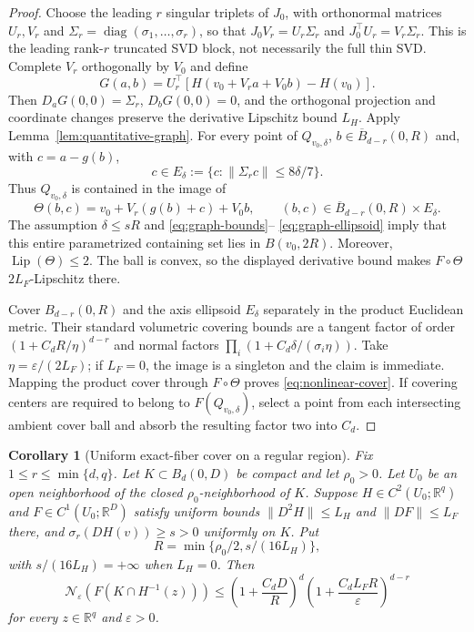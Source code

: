 \documentclass[11pt]{article}
\newtheorem{corollary}[theorem]{Corollary}
\theoremstyle{definition}
\newcommand{\R}{\mathbb R}
\newcommand{\cN}{\mathcal N}
\begin{document}
\begin{proof}
Choose the leading $r$ singular triplets of $J_0$, with orthonormal matrices
$U_r,V_r$ and $\Sigma_r=\operatorname{diag}(\sigma_1,\ldots,\sigma_r)$, so
that $J_0V_r=U_r\Sigma_r$ and $J_0^\top U_r=V_r\Sigma_r$.  This is the
leading rank-$r$ truncated SVD block, not necessarily the full thin SVD.
Complete $V_r$ orthogonally by $V_0$ and define
\[
 G(a,b)=U_r^\top
 [H(v_0+V_ra+V_0b)-H(v_0)].
\]
Then $D_aG(0,0)=\Sigma_r$, $D_bG(0,0)=0$, and the orthogonal projection and
coordinate changes preserve the derivative Lipschitz bound $L_H$.  Apply
Lemma~\ref{lem:quantitative-graph}.  For every point of $Q_{v_0,\delta}$,
$b\in\overline B_{d-r}(0,R)$ and, with $c=a-g(b)$,
\[
 c\in E_\delta
 :=\{c:\|\Sigma_rc\|\le8\delta/7\}.
\]
Thus $Q_{v_0,\delta}$ is contained in the image of
\[
 \Theta(b,c)=v_0+V_r(g(b)+c)+V_0b,
 \qquad (b,c)\in\overline B_{d-r}(0,R)\times E_\delta.
\]
The assumption $\delta\le sR$ and \eqref{eq:graph-bounds}--
\eqref{eq:graph-ellipsoid} imply that this entire parametrized containing set
lies in $B(v_0,2R)$.  Moreover, $\operatorname{Lip}(\Theta)\le2$.  The ball
is convex, so the displayed derivative bound makes
$F\circ\Theta$ $2L_F$-Lipschitz there.

Cover $B_{d-r}(0,R)$ and the axis ellipsoid $E_\delta$ separately in the
product Euclidean metric.  Their standard volumetric covering bounds are a
tangent factor of order $(1+C_dR/\eta)^{d-r}$ and normal factors
$\prod_i(1+C_d\delta/(\sigma_i\eta))$.  Take
$\eta=\varepsilon/(2L_F)$; if $L_F=0$, the image is a singleton and the
claim is immediate.  Mapping the product cover through $F\circ\Theta$ proves
\eqref{eq:nonlinear-cover}.  If covering centers are required to belong to
$F(Q_{v_0,\delta})$, select a point from each intersecting ambient cover ball
and absorb the resulting factor two into $C_d$.
\end{proof}

\begin{corollary}[Uniform exact-fiber cover on a regular region]
\label{cor:uniform-fiber}
Fix $1\le r\le\min\{d,q\}$.  Let $K\subset B_d(0,D)$ be compact and let
$\rho_0>0$.  Let $U_0$ be an open
neighborhood of the closed $\rho_0$-neighborhood of $K$.  Suppose
$H\in C^2(U_0;\R^q)$ and $F\in C^1(U_0;\R^D)$ satisfy uniform bounds
$\|D^2H\|\le L_H$ and $\|DF\|\le L_F$ there, and
$\sigma_r(DH(v))\ge s>0$ uniformly on $K$.  Put
\[
 R=\min\{\rho_0/2,s/(16L_H)\},
\]
with $s/(16L_H)=+\infty$ when $L_H=0$.  Then
\[
 \cN_\varepsilon(F(K\cap H^{-1}(z)))
 \le \left(1+\frac{C_dD}{R}\right)^d
 \left(1+\frac{C_dL_FR}{\varepsilon}\right)^{d-r}
\]
for every $z\in\R^q$ and $\varepsilon>0$.
\end{corollary}
\end{document}
